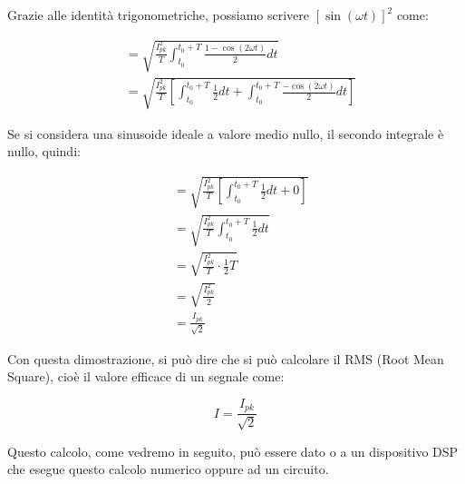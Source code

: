 Grazie alle identità trigonometriche, possiamo scrivere $\left[ \sin(\omega t) \right] ^{2} $ come: 

{
    \Large 
    \begin{equation}
        \begin{split}
        &= 
        \sqrt
        {
            \frac{I_{pk}^{2}}{T}
            \int_{t_0}^{t_0 + T}
            \frac{1 - \cos(2 \omega t)}{2} 
            dt
        }
        \\
        &= 
        \sqrt
        {
            \frac{I_{pk}^{2}}{T}
            \left[ 
            \int_{t_0}^{t_0 + T}
            \frac{1}{2} 
            dt
            +
            \int_{t_0}^{t_0 + T}
            \frac{-\cos(2 \omega t)}{2} 
            dt
            \right]
        }
        \end{split}
    \end{equation}
}

Se si considera una sinusoide ideale a valore medio nullo, 
il secondo integrale è nullo, quindi: 

{
    \Large 
    \begin{equation}
        \begin{split}
         &= 
        \sqrt
        {
            \frac{I_{pk}^{2}}{T}
            \left[ 
            \int_{t_0}^{t_0 + T}
            \frac{1}{2} 
            dt
            +
            0
            \right]
        }
        \\ 
        &= 
        \sqrt
        {
            \frac{I_{pk}^{2}}{T}
            \int_{t_0}^{t_0 + T}
            \frac{1}{2} 
            dt
        }
        \\
        &=
        \sqrt
        {
            \frac{I_{pk}^{2}}{T}
            \cdot
            \frac{1}{2} 
            T 
        }
        \\
        &= 
        \sqrt{\frac{I_{pk} ^{2}}{2}}
        \\ 
        &= 
        \frac{I_{pk}}{\sqrt{2}}
        \end{split}
    \end{equation}
}

Con questa dimostrazione, si può dire che si può calcolare il RMS (Root Mean Square), 
cioè il valore efficace di un segnale come: 

{
    \Large 
    \begin{equation}
        I = \frac{I_{pk}}{\sqrt{2}}
    \end{equation}
}

Questo calcolo, come vedremo in seguito, può essere dato o a un dispositivo DSP che esegue questo calcolo numerico oppure ad un circuito. \newline 

